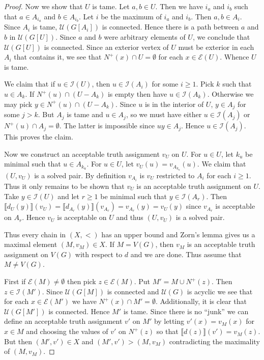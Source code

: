 \documentclass[12pt]{article}
\theoremstyle{remark}
\newcommand{\fancy}[1]{\mathcal{#1}}
\def\I{\fancy{I}}
\def\U{\fancy{U}}
\def\E{\fancy{E}}
\begin{document}
\begin{proof}
Now we show that $U$ is tame.  Let $a, b \in U$. Then we have $i_a$ and $i_b$ such that $a \in A_{i_a}$ and $b \in A_{i_b}$. Let $i$ be the maximum of $i_a$ and $i_b$.  Then $a,b \in A_i$.  Since $A_i$ is tame, $\U(G[A_i])$ is connected.  Hence there is a path between $a$ and $b$ in $\U(G[U])$.  Since $a$ and $b$ were arbitrary elements of $U$, we conclude that $\U(G[U])$ is connected. Since an exterior vertex of $U$ must be exterior in each $A_i$ that contains it, we see that $N^+(x) \cap U = \emptyset$ for each $x \in \E(U)$.  Whence $U$ is tame.\newline

We claim that if $u \in \I(U)$, then $u \in \I(A_i)$ for some $i \geq 1$.  Pick $k$ such that $u \in A_k$.  If $N^+(u) \cap \left(U - A_k\right)$ is empty then have $u \in \I(A_k)$. Otherwise we may pick $y \in N^+(u) \cap \left(U - A_k\right)$.  Since $u$ is in the interior of $U$, $y \in A_j$ for some $j > k$.  But $A_j$ is tame and $u \in A_j$, so we must have either $u \in \I(A_j)$ or $N^+(u) \cap A_j = \emptyset$. The latter is impossible since $uy \in A_j$.  Hence $u \in \I(A_j)$. This proves the claim.\newline

Now we construct an acceptable truth assignment $v_U$ on $U$.  For $u \in U$, let $k_u$ be minimal such that $u \in A_{k_u}$.  For $u \in U$, let $v_U(u) = v_{A_{k_u}}(u)$. We claim that $(U, v_U)$ is a solved pair.  By definition $v_{A_i}$ is $v_U$ restricted to $A_i$ for each $i \geq 1$.  Thus it only remains to be shown that $v_U$ is an acceptable truth assignment on $U$.  Take $y \in \I(U)$ and let $r \geq 1$ be minimal such that $y \in \I(A_r)$.  Then $\llbracket d_U(y) \rrbracket(v_U) = \llbracket d_{A_r}(y) \rrbracket(v_{A_r}) = v_{A_r}(y) = v_U(y)$ since $v_{A_r}$ is acceptable on $A_r$.  Hence $v_U$ is acceptable on $U$ and thus $(U, v_U)$ is a solved pair.\newline

Thus every chain in $(X, <)$ has an upper bound and Zorn's lemma gives us a maximal element $(M, v_M) \in X$.  If $M = V(G)$, then $v_M$ is an acceptable truth assignment on $V(G)$ with respect to $d$ and we are done.  Thus assume that $M \neq V(G)$.\newline

First if $\E(M) \neq \emptyset$ then pick $z \in \E(M)$.  Put $M' = M \cup N^+(z)$.  Then $z \in \I(M')$. Since $\U(G[M])$ is connected and $\U(G)$ is acyclic we see that for each $x \in \E(M')$ we have $N^+(x) \cap M' = \emptyset$.  Additionally, it is clear that $\U(G[M'])$ is connected.  Hence $M'$ is tame.  Since there is no ``junk'' we can define an acceptable truth assignment $v'$ on $M'$ by letting $v'(x) = v_M(x)$ for $x \in M$ and choosing the values of $v'$ on $N^+(z)$ so that $\llbracket d(z) \rrbracket(v') = v_M(z)$.  But then $(M', v') \in X$ and $(M', v') > (M, v_M)$ contradicting the maximality of $(M, v_M)$.\newline


\end{proof}
\end{document}
